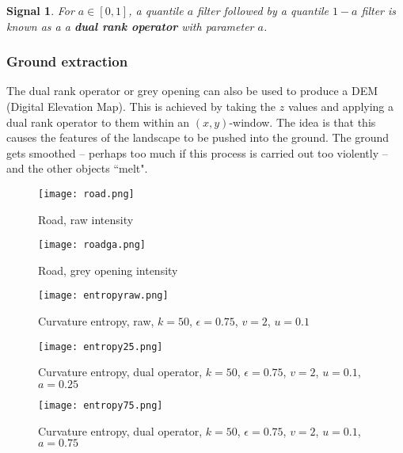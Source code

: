 \documentclass[a4paper,11pt,twoside]{article}
\newtheorem*{signals}{Signal}
\theoremstyle{definition}
\theoremstyle{remark}
\newenvironment{sigs}
   {\colorlet{shadecolor}{green!50}\begin{shaded}\begin{signals}}
   {\end{signals}\end{shaded}}
\begin{document}
\begin{sigs}For $a\in [0,1]$, a quantile $a$ filter followed by a quantile $1-a$ filter is known as a a \textbf{dual rank operator} with parameter $a$.
\end{sigs}
\begin{center}
\end{center}
\subsubsection{Ground extraction}
The dual rank operator or grey opening can also be used to produce a DEM (Digital Elevation Map). This is achieved by taking the $z$ values and applying a dual rank operator to them within an $(x,y)$-window. The idea is that this causes the features of the landscape to be pushed into the ground. The ground gets smoothed -- perhaps too much if this process is carried out too violently -- and the other objects ``melt".
\newpage
\begin{figure}[!h]
  \caption{Road, raw intensity}
  \centering
    \texttt{[image: road.png]}
    \label{rd}
\end{figure}
\begin{figure}[!h]
  \caption{Road, grey opening intensity}
  \centering
    \texttt{[image: roadga.png]}
    \label{rdgo}
\end{figure}
\newpage
\newpage
\begin{figure}[!h]
  \caption{Curvature entropy, raw, $k=50$, $\epsilon = 0.75$, $v=2$, $u=0.1$}
  \centering
    \texttt{[image: entropyraw.png]}
    \label{ent00}
\end{figure}
\begin{figure}[!h]
  \caption{Curvature entropy, dual operator, $k=50$, $\epsilon = 0.75$, $v=2$, $u=0.1$, $a=0.25$}
  \centering
    \texttt{[image: entropy25.png]}
    \label{ent25}
\end{figure}
\newpage
\begin{figure}[!h]
  \caption{Curvature entropy, dual operator, $k=50$, $\epsilon = 0.75$, $v=2$, $u=0.1$, $a=0.75$}
  \centering
    \texttt{[image: entropy75.png]}
    \label{ent75}
\end{figure}
\newpage
\end{document}
